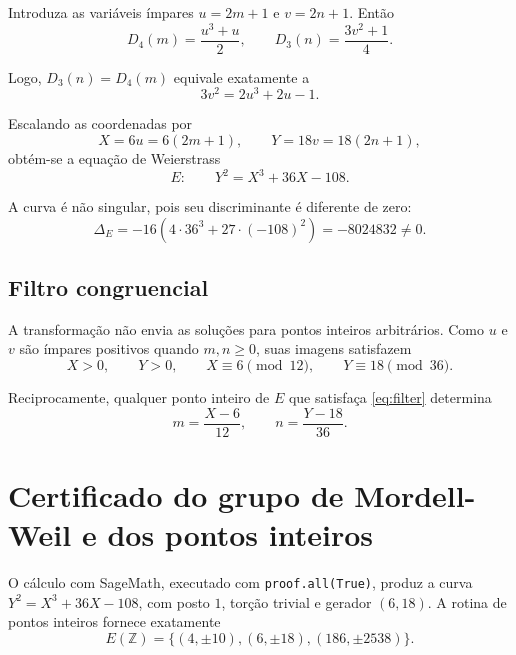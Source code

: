 \documentclass[11pt,letterpaper]{article}
\theoremstyle{definition}
\newcommand{\Dd}[2]{D_{#1}\!\left(#2\right)}
\begin{document}
Introduza as variáveis ímpares
\(u=2m+1\) e \(v=2n+1\). Então
\begin{equation}
  \Dd{4}{m}=\frac{u^3+u}{2},
  \qquad
  \Dd{3}{n}=\frac{3v^2+1}{4}.
  \label{eq:uv}
\end{equation}

Logo, \(\Dd{3}{n}=\Dd{4}{m}\) equivale exatamente a
\begin{equation}
  3v^2=2u^3+2u-1.
  \label{eq:uvcurve}
\end{equation}

Escalando as coordenadas por
\begin{equation}
  X=6u=6(2m+1),
  \qquad
  Y=18v=18(2n+1),
  \label{eq:coordinates}
\end{equation}
obtém-se a equação de Weierstrass
\begin{equation}
  E:\qquad Y^2=X^3+36X-108.
  \label{eq:curve}
\end{equation}

A curva é não singular, pois seu discriminante é diferente de zero:
\begin{equation}
  \Delta_E
  =-16\left(4\cdot36^3+27\cdot(-108)^2\right)
  =-8024832\neq0.
  \label{eq:discriminant}
\end{equation}

\subsection{Filtro congruencial}

A transformação não envia as soluções para pontos inteiros arbitrários. Como \(u\) e \(v\) são ímpares positivos quando \(m,n\geq0\), suas imagens satisfazem
\begin{equation}
  X>0,\qquad Y>0,\qquad
  X\equiv6\pmod{12},\qquad
  Y\equiv18\pmod{36}.
  \label{eq:filter}
\end{equation}

Reciprocamente, qualquer ponto inteiro de \(E\) que satisfaça \eqref{eq:filter} determina
\begin{equation}
  m=\frac{X-6}{12},
  \qquad
  n=\frac{Y-18}{36}.
  \label{eq:inverse}
\end{equation}

\section{Certificado do grupo de Mordell-Weil e dos pontos inteiros}

O cálculo com SageMath, executado com \texttt{proof.all(True)}, produz a curva
\(Y^2=X^3+36X-108\), com posto \(1\), torção trivial e gerador \((6,18)\). A rotina de pontos inteiros fornece exatamente
\begin{equation}
  E(\mathbb{Z})=
  \{(4,\pm10),(6,\pm18),(186,\pm2538)\}.
\end{equation}
\end{document}
